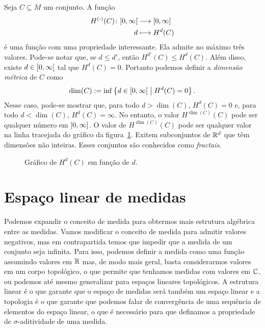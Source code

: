 Seja $C \subseteq M$ um conjunto. A função
	\begin{align*}
	{H^{(\bm{\cdot})}(C)}\colon {\left[{0},{\infty}\right[} &\longrightarrow {\left[{0},{\infty}\right]} \\{d} &\longmapsto H^d(C)
	\end{align*}
é uma função com uma propriedade interessante. Ela admite no máximo três valores. Pode-se notar que, se $d \leq d'$, então $H^{d'}(C) \leq H^d(C)$. Além disso, existe $d \in \left[{0},{\infty}\right[$ tal que $H^d(C) = 0$. Portanto podemos definir a \emph{dimensão métrica} de $C$ como
	\begin{equation*}
	\dim(C) := \inf\left\{{d \in \left[{0},{\infty}\right[}\;\middle\vert\;{H^d(C)=0}\right\}.
	\end{equation*}
Nesse caso, pode-se mostrar que, para todo $d>\dim(C)$, $H^d(C) = 0$ e, para todo $d < \dim(C)$, $H^d(C) = \infty$. No entanto, o valor $H^{\dim(C)}(C)$ pode ser qualquer número em $\left[{0},{\infty}\right]$. O valor de $H^{\dim(C)}(C)$ pode ser qualquer valor na linha tracejada do gráfico da figura~\ref{fig:dimensaometrica}. Exitem subconjuntos de $\mathbb{R}^d$ que têm dimensões não inteiras. Esses conjuntos são conhecidos como \emph{fractais}.

\begin{figure}
\centering
{}
\caption{Gráfico de $H^d(C)$ em função de $d$.}
\label{fig:dimensaometrica}
\end{figure}









\section{Espaço linear de medidas}

Podemos expandir o conceito de medida para obtermos mais estrutura algébrica entre as medidas. Vamos modificar o conceito de medida para admitir valores negativos, mas em contrapartida temos que impedir que a medida de um conjunto seja infinita. Para isso, podemos definir a medida como uma função assumindo valores em $\mathbb{R}$ mas, de modo mais geral, basta considerarmos valores em um corpo topológico, o que permite que tenhamos medidas com valores em $\mathbb{C}$, ou podemos até mesmo generalizar para espaços lineares topológicos. A estrutura linear é o que garante que o espaço de medidas será também um espaço linear e a topologia é o que garante que podemos falar de convergência de uma sequência de elementos do espaço linear, o que é necessário para que definamos a propriedade de $\sigma$-aditividade de uma medida.


